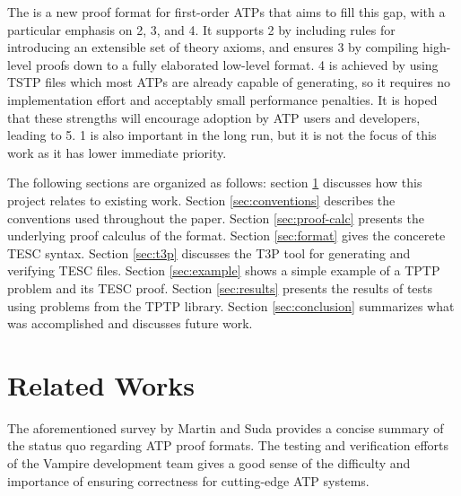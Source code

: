 \documentclass[12pt]{article}
\begin{document}


The \href{https://github.com/skbaek/tesc}{\color{blue}{Theory Extensible Sequent Calculus (TESC)}} 
is a new proof format for first-order ATPs that aims to fill this gap, with a particular emphasis on 2, 3, and 4. 
It supports 2 by including rules for introducing an extensible set of theory axioms, 
and ensures 3 by compiling high-level proofs down to a fully elaborated low-level format. 
4 is achieved by using TSTP files which most ATPs are already capable of generating, 
so it requires no implementation effort and acceptably small performance penalties.
It is hoped that these strengths will encourage adoption by ATP users and developers, leading to 5. 
1 is also important in the long run, but it is not the focus of this work as it has lower immediate priority.

% 
The following sections are organized as follows: 
section \ref{sec:rel-works} discusses how this project relates to existing work. 
Section \ref{sec:conventions} describes the conventions used throughout the paper.
Section \ref{sec:proof-calc} presents the underlying proof calculus of the format.
Section \ref{sec:format} gives the concerete TESC syntax. 
Section \ref{sec:t3p} discusses the T3P tool for generating and verifying TESC files. 
Section \ref{sec:example} shows a simple example of a TPTP problem and its TESC proof.
Section \ref{sec:results} presents the results of tests using problems from the TPTP library. 
Section \ref{sec:conclusion} summarizes what was accomplished and discusses future work.



\section{Related Works} \label{sec:rel-works} 

The aforementioned survey by Martin and Suda \cite{} provides a concise summary of the status quo regarding 
ATP proof formats. The testing and verification efforts of the Vampire development team \cite{} gives a good 
sense of the difficulty and importance of ensuring correctness for cutting-edge ATP systems.
\end{document}
